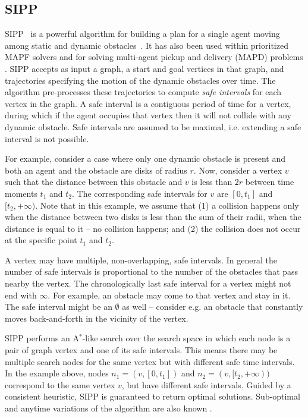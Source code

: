 \documentclass[review]{elsarticle}
\newcommand{\sipp}{\ac{SIPP}\xspace}
\newcommand{\astar}{A$^*$\xspace}
\newcommand{\mapf}{\ac{MAPF}\xspace}
\begin{document}
\subsection{\sipp}
\sipp~\cite{phillips2011sipp} is a powerful algorithm for building a plan for a single agent moving among static and dynamic obstacles~\cite{phillips2011sipp}. 
It has also been used within prioritized \mapf solvers \cite{yakovlev2017anyAngle} and for solving multi-agent pickup and delivery (MAPD) problems \cite{ma2019lifelong}. 
\sipp accepts as input a graph, a start and goal vertices in that graph, and trajectories specifying the motion of the dynamic obstacles over time. 
The algorithm pre-processes these trajectories to compute \emph{safe intervals} for each vertex in the graph. 
A safe interval is a contiguous period of time for a vertex, during which if the agent occupies that vertex then it will not collide with any dynamic obstacle. 
Safe intervals are assumed to be maximal, i.e. extending a safe interval is not possible.

For example, consider a case where only one dynamic obstacle is present and both an agent and the obstacle are disks of radius $r$.
Now, consider a vertex $v$ such that the distance between this obstacle and $v$ is less than $2r$ between time moments $t_1$ and $t_2$. The corresponding safe intervals for $v$ are $[0, t_1]$ and $[t_2, +\infty)$.
Note that in this example, we assume that (1) a collision happens only when the distance between two disks is less than the sum of their radii, when the distance is equal to it -- no collision happens; and (2) the collision does not occur at the specific point $t_1$ and $t_2$.

A vertex may have multiple, non-overlapping, safe intervals. 
In general the number of safe intervals is proportional to the number of the obstacles that pass nearby the vertex. The chronologically last safe interval for a vertex might not end with $\infty$. For example, an obstacle may come to that vertex and stay in it. The safe interval might be an $\emptyset$ as well -- consider e.g. an obstacle that constantly moves back-and-forth in the vicinity of the vertex. 



\sipp performs an \astar-like search over the search space in which each node is a pair of graph vertex and one of its safe intervals. This means there may be multiple search nodes for the same vertex but with different safe time intervals. In the example above, nodes
$n_1=(v, [0, t_1])$ and $n_2=(v, [t_2, +\infty) )$ 
correspond to the same vertex $v$, but have different safe intervals.
Guided by a consistent heuristic, \sipp is guaranteed to return optimal solutions. 
Sub-optimal and anytime variations of the algorithm are also known \cite{narayanan2012anytime,yakovlev2020revisiting}. %
\end{document}
